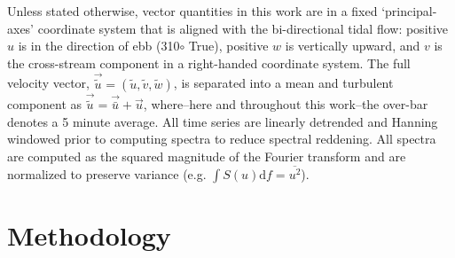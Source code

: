 \documentclass[twocol]{ametsoc}
\begin{document}
Unless stated otherwise, vector quantities in this work are in a fixed `principal-axes' coordinate system that is aligned with the bi-directional tidal flow: positive $u$ is in the direction of ebb (310$\circ$ True), positive $w$ is vertically upward, and $v$ is the cross-stream component in a right-handed coordinate system. The full velocity vector, $\vec{\tilde{u}} = (\tilde{u}, \tilde{v}, \tilde{w})$, is separated into a mean and turbulent component as $\vec{\tilde{u}} = \vec{\bar{u}} + \vec{u}$, where--here and throughout this work--the over-bar denotes a 5 minute average.  All time series are linearly detrended and Hanning windowed prior to computing spectra to reduce spectral reddening. All spectra are computed as the squared magnitude of the Fourier transform and are normalized to preserve variance (e.g. $\int S(u)\mathrm{d}f = \overline{u^2}$).

\section{Methodology}

\end{document}
